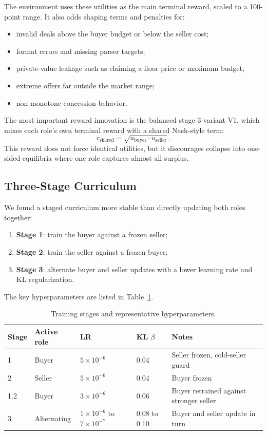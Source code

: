 \documentclass[11pt]{article}
\begin{document}
The environment uses these utilities as the main terminal reward, scaled to a 100-point range. It also adds shaping terms and penalties for:
\begin{itemize}
    \item invalid deals above the buyer budget or below the seller cost;
    \item format errors and missing parser targets;
    \item private-value leakage such as claiming a floor price or maximum budget;
    \item extreme offers far outside the market range;
    \item non-monotone concession behavior.
\end{itemize}

The most important reward innovation is the balanced stage-3 variant V1, which mixes each role's own terminal reward with a shared Nash-style term:
\begin{equation}
    r_{\text{shared}} = \sqrt{u_{\text{buyer}} \cdot u_{\text{seller}}}.
\end{equation}
This reward does not force identical utilities, but it discourages collapse into one-sided equilibria where one role captures almost all surplus.

\subsection{Three-Stage Curriculum}

We found a staged curriculum more stable than directly updating both roles together:
\begin{enumerate}
    \item \textbf{Stage 1}: train the buyer against a frozen seller;
    \item \textbf{Stage 2}: train the seller against a frozen buyer;
    \item \textbf{Stage 3}: alternate buyer and seller updates with a lower learning rate and KL regularization.
\end{enumerate}

The key hyperparameters are listed in Table~\ref{tab:training-stages}.

\begin{table}[H]
\centering
\caption{Training stages and representative hyperparameters.}
\label{tab:training-stages}
\begin{tabular}{lllll}
\toprule
Stage & Active role & LR & KL $\beta$ & Notes \\
\midrule
1 & Buyer & $5\times10^{-6}$ & 0.04 & Seller frozen, cold-seller guard \\
2 & Seller & $5\times10^{-6}$ & 0.04 & Buyer frozen \\
1.2 & Buyer & $3\times10^{-6}$ & 0.06 & Buyer retrained against stronger seller \\
3 & Alternating & $1\times10^{-6}$ to $7\times10^{-7}$ & 0.08 to 0.10 & Buyer and seller update in turn \\
\bottomrule
\end{tabular}
\end{table}
\end{document}
